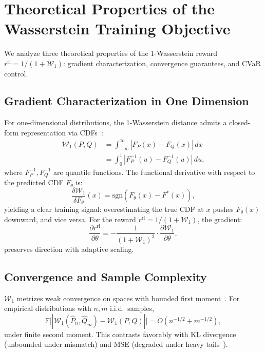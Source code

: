 \section{Theoretical Properties of the Wasserstein Training Objective}
\label{app:wasserstein_theory}

We analyze three theoretical properties of the 1-Wasserstein reward $r^{\text{rl}} = 1/(1 + \mathcal{W}_1)$: gradient characterization, convergence guarantees, and CVaR control.

\subsection{Gradient Characterization in One Dimension}

For one-dimensional distributions, the 1-Wasserstein distance admits a closed-form representation via CDFs~\cite{villani2009optimal}:
\begin{align}
\mathcal{W}_1(P, Q) &= \int_{-\infty}^{\infty} |F_P(x) - F_Q(x)| \, dx \\
&= \int_{0}^{1} |F_P^{-1}(u) - F_Q^{-1}(u)| \, du,
\end{align}
where $F_P^{-1}, F_Q^{-1}$ are quantile functions. The functional derivative with respect to the predicted CDF $F_\theta$ is:
\begin{equation}
\frac{\delta \mathcal{W}_1}{\delta F_\theta}(x) = \text{sgn}(F_\theta(x) - F^*(x)),
\end{equation}
yielding a clear training signal: overestimating the true CDF at $x$ pushes $F_\theta(x)$ downward, and vice versa. For the reward $r^{\text{rl}} = 1/(1+\mathcal{W}_1)$, the gradient:
\begin{equation}
\frac{\partial r^{\text{rl}}}{\partial \theta} = -\frac{1}{(1+\mathcal{W}_1)^2} \cdot \frac{\partial \mathcal{W}_1}{\partial \theta},
\end{equation}
preserves direction with adaptive scaling.

\subsection{Convergence and Sample Complexity}

$\mathcal{W}_1$ metrizes weak convergence on spaces with bounded first moment~\cite{villani2009optimal}. For empirical distributions with $n,m$ i.i.d.\ samples,
\begin{equation}
\mathbb{E}\big[|\mathcal{W}_1(\hat{P}_n, \hat{Q}_m) - \mathcal{W}_1(P,Q)|\big] = O(n^{-1/2} + m^{-1/2}),
\end{equation}
under finite second moment. This contrasts favorably with KL divergence (unbounded under mismatch) and MSE (degraded under heavy tails~\cite{cont2001empirical}).

